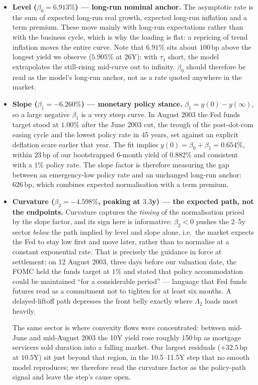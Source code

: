 \documentclass[11pt]{article}
\begin{document}
\begin{itemize}\itemsep3pt
  \item \textbf{Level ($\beta_0=6.913\%$) --- long-run nominal anchor.} The asymptotic rate is the
        sum of expected long-run real growth, expected long-run inflation and a term premium. These
        move mainly with long-run expectations rather than with the business cycle, which is why
        the loading is flat: a repricing of
        trend inflation moves the entire curve. Note that $6.91\%$ sits about $100$\,bp above the
        longest yield we observe ($5.905\%$ at 26Y): with $\tau_1$ short, the model extrapolates
        the still-rising mid-curve out to infinity. $\beta_0$ should therefore be read as the
        model's long-run anchor, not as a rate quoted anywhere in the market.
  \item \textbf{Slope ($\beta_1=-6.260\%$) --- monetary policy stance.} $\beta_1=y(0)-y(\infty)$,
        so a large negative $\beta_1$ is a very steep curve. In August 2003 the Fed funds target
        stood at $1.00\%$ after the June 2003 cut, the trough of the post-dot-com easing cycle and
        the lowest policy rate in 45 years, set against an explicit deflation scare earlier that
        year. The fit implies $y(0)=\beta_0+\beta_1=0.654\%$, within $23$\,bp of our bootstrapped
        6-month yield of $0.882\%$ and consistent with a $1\%$ policy rate. The slope factor is
        therefore measuring the gap between an emergency-low policy rate and an unchanged long-run
        anchor: $626$\,bp, which combines expected normalisation with a
        term premium.
  \item \textbf{Curvature ($\beta_2=-4.598\%$, peaking at $3.3$y) --- the expected path, not the
        endpoints.} Curvature captures the \emph{timing} of the normalisation priced by the slope
        factor, and its sign here is informative: $\beta_2<0$ pushes the 2--5y sector \emph{below}
        the path implied by level and slope alone, i.e.\ the market expects the Fed to stay low
        first and move later, rather than to normalise at a constant exponential rate. That is
        precisely the guidance in force at settlement: on 12 August 2003, three days before our
        valuation date, the FOMC held the funds target at $1\%$ and stated that policy
        accommodation could be maintained ``for a considerable period'' --- language that Fed funds
        futures read as a commitment not to tighten for at least six months. A delayed-liftoff path
        depresses the front belly exactly where $\Lambda_2$ loads most heavily.
 
        The same sector is where convexity flows were concentrated: between mid-June and mid-August
        2003 the 10Y yield rose roughly 150\,bp as mortgage servicers sold duration into a falling
        market. Our largest residuals ($+32.5$\,bp at $10.5$Y) sit just beyond that region, in
        the 10.5--11.5Y step that no smooth model reproduces; we therefore read the curvature
        factor as the policy-path signal and leave the step's cause open.
\end{itemize}
 
\end{document}

